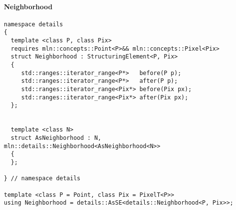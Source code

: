 \paragraph{Neighborhood}

\begin{verbatim}
namespace details
{
  template <class P, class Pix>
  requires mln::concepts::Point<P>&& mln::concepts::Pixel<Pix>
  struct Neighborhood : StructuringElement<P, Pix>
  {
     std::ranges::iterator_range<P*>   before(P p);
     std::ranges::iterator_range<P*>   after(P p);
     std::ranges::iterator_range<Pix*> before(Pix px);
     std::ranges::iterator_range<Pix*> after(Pix px);
  };


  template <class N>
  struct AsNeighborhood : N, mln::details::Neighborhood<AsNeighborhood<N>>
  {
  };

} // namespace details

template <class P = Point, class Pix = PixelT<P>>
using Neighborhood = details::AsSE<details::Neighborhood<P, Pix>>;
\end{verbatim}
